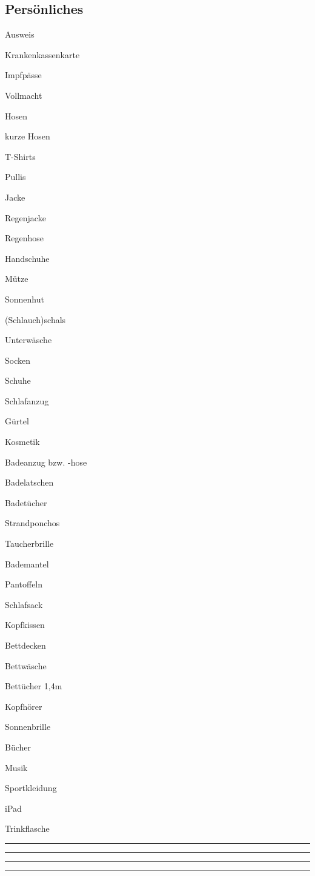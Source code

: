 
\subsection*{Persönliches}

\begin{TWOitemize}
    \item{Ausweis}
    \item{Krankenkassenkarte}
    \item{Impfpässe}
    \item{Vollmacht}
    \item{Hosen}
    \item{kurze Hosen}
    \item{T-Shirts}
    \item{Pullis}
    \item{Jacke}
    \item{Regenjacke}
    \item{Regenhose}
    \item{Handschuhe}
    \item{Mütze}
    \item{Sonnenhut}
    \item{(Schlauch)schals}
    \item{Unterwäsche}
    \item{Socken}
    \item{Schuhe}
    \item{Schlafanzug}
    \item{Gürtel}
    \item{Kosmetik}
    \item{Badeanzug bzw. -hose}
    \item{Badelatschen}
    \item{Badetücher}
    \item{Strandponchos}
    \item{Taucherbrille}
    \item{Bademantel}
    \item{Pantoffeln}
    \item{Schlafsack}
    \item{Kopfkissen}
    \item{Bettdecken}
    \item{Bettwäsche}
    \item{Bettücher 1,4m}
    \item{Kopfhörer}
    \item{Sonnenbrille}
    \item{Bücher}
    \item{Musik}
    \item{Sportkleidung}
    \item{iPad}
    \item{Trinkflasche}
    \item{\rule{50mm}{0.4pt}}
    \item{\rule{50mm}{0.4pt}}
    \item{\rule{50mm}{0.4pt}}
    \item{\rule{50mm}{0.4pt}}
\end{TWOitemize}
